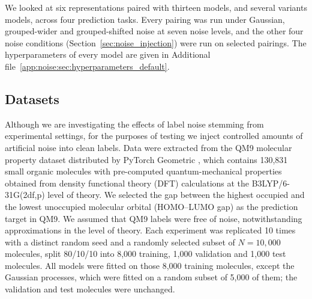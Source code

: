 We looked at six representations paired with thirteen models, and several variants models, across four prediction tasks. Every pairing was run under Gaussian, grouped-wider and grouped-shifted noise at seven noise levels, and the other four noise conditions (Section~\ref{sec:noise_injection}) were run on selected pairings. The hyperparameters of every model are given in Additional file~\ref{app:noise:sec:hyperparameters_default}.



\subsection{Datasets}

Although we are investigating the effects of label noise stemming from experimental settings, for the purposes of testing we inject controlled amounts of artificial noise into clean labels. Data were extracted from the QM9 molecular property dataset distributed by PyTorch Geometric \citep{Ramakrishnan2014}, which contains 130,831 small organic molecules with pre-computed quantum-mechanical properties obtained from density functional theory (DFT) calculations at the B3LYP/6-31G(2df,p) level of theory. We selected the gap between the highest occupied and the lowest unoccupied molecular orbital (HOMO--LUMO gap) as the prediction target in QM9. We assumed that QM9 labels were free of noise, notwithstanding approximations in the level of theory. Each experiment was replicated 10 times with a distinct random seed and a randomly selected subset of $N = 10{,}000$ molecules, split 80/10/10 into 8,000 training, 1,000 validation and 1,000 test molecules. All models were fitted on those 8,000 training molecules, except the Gaussian processes, which were fitted on a random subset of 5,000 of them; the validation and test molecules were unchanged.

